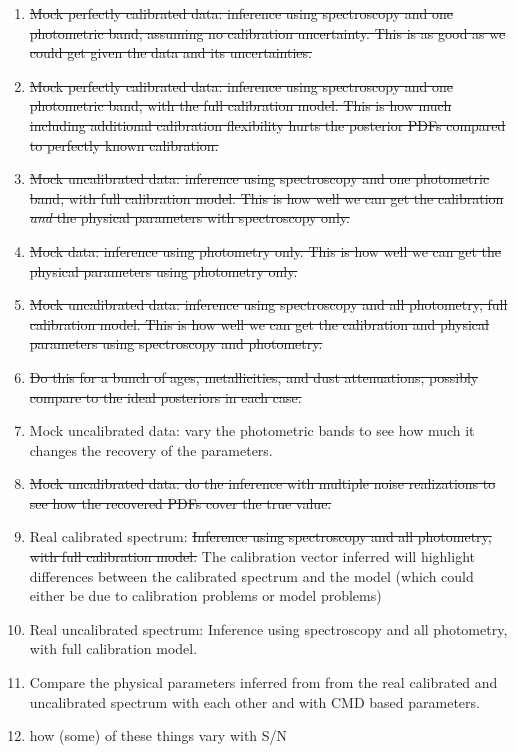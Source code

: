 \documentclass[iop,numberedappendix]{emulateapj}
\begin{document}
\begin{enumerate}

\item \sout{Mock perfectly calibrated data: inference using spectroscopy and one
  photometric band, assuming no calibration uncertainty.  This is as
  good as we could get given the data and its uncertainties.}

\item \sout{Mock perfectly calibrated data: inference using spectroscopy and one
  photometric band, with the full calibration model.  This is how much
  including additional calibration flexibility hurts the posterior
  PDFs compared to perfectly known calibration.}

\item \sout{Mock uncalibrated data:  inference using spectroscopy and one
  photometric band, with full calibration model.  This is how well we
  can get the calibration \emph{and} the physical parameters with
  spectroscopy only.}

\item \sout{Mock data: inference using photometry only.  This is how well we
  can get the physical parameters using photometry only.}

\item \sout{Mock uncalibrated data: inference using spectroscopy and all
  photometry, full calibration model.  This is how well we
  can get the calibration and physical parameters using spectroscopy
  and photometry.}

\item \sout{Do this for a bunch of ages, metallicities, and dust
  attenuations, possibly compare to the ideal posteriors in each case.}

\item Mock uncalibrated data:  vary the photometric bands to see how
  much it changes the recovery of the parameters.

\item \sout{Mock uncalibrated data: do the inference with multiple noise
  realizations to see how the recovered PDFs cover the true value.}

\item Real calibrated spectrum:   \sout{Inference using spectroscopy and all
  photometry, with full calibration model.} The calibration vector
  inferred will highlight differences between the calibrated spectrum
  and the model (which could either be due to calibration problems or
  model problems)

\item Real uncalibrated spectrum:   Inference using spectroscopy and all
  photometry, with full calibration model. 

\item Compare the physical parameters inferred from from the real
  calibrated and uncalibrated spectrum with each other and with CMD
  based parameters.

\item how (some) of these things vary with S/N

\end{enumerate}
\end{document}
